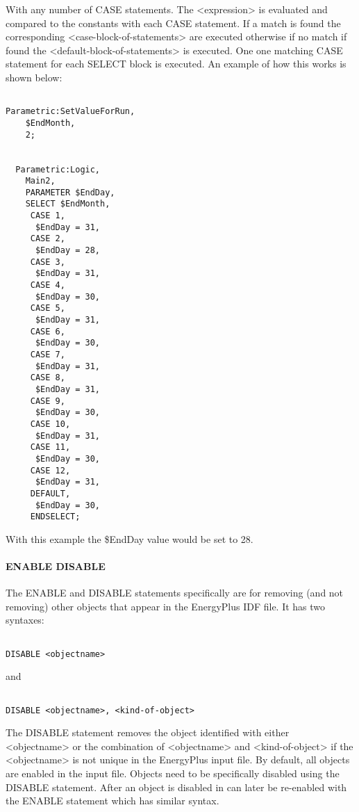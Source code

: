 With any number of CASE statements. The \textless{}expression\textgreater{} is evaluated and compared to the constants with each CASE statement. If a match is found the corresponding \textless{}case-block-of-statements\textgreater{} are executed otherwise if no match if found the \textless{}default-block-of-statements\textgreater{} is executed. One one matching CASE statement for each SELECT block is executed. An example of how this works is shown below:

\begin{lstlisting}

Parametric:SetValueForRun,
    $EndMonth,
    2;


  Parametric:Logic,
    Main2,
    PARAMETER $EndDay,
    SELECT $EndMonth,
     CASE 1,
      $EndDay = 31,
     CASE 2,
      $EndDay = 28,
     CASE 3,
      $EndDay = 31,
     CASE 4,
      $EndDay = 30,
     CASE 5,
      $EndDay = 31,
     CASE 6,
      $EndDay = 30,
     CASE 7,
      $EndDay = 31,
     CASE 8,
      $EndDay = 31,
     CASE 9,
      $EndDay = 30,
     CASE 10,
      $EndDay = 31,
     CASE 11,
      $EndDay = 30,
     CASE 12,
      $EndDay = 31,
     DEFAULT,
      $EndDay = 30,
     ENDSELECT;
\end{lstlisting}

With this example the \$EndDay value would be set to 28.

\paragraph{ENABLE DISABLE}\label{enable-disable}

The ENABLE and DISABLE statements specifically are for removing (and not removing) other objects that appear in the EnergyPlus IDF file. It has two syntaxes:

\begin{lstlisting}

DISABLE <objectname>
\end{lstlisting}

and

\begin{lstlisting}

DISABLE <objectname>, <kind-of-object>
\end{lstlisting}

The DISABLE statement removes the object identified with either \textless{}objectname\textgreater{} or the combination of \textless{}objectname\textgreater{} and \textless{}kind-of-object\textgreater{} if the \textless{}objectname\textgreater{} is not unique in the EnergyPlus input file. By default, all objects are enabled in the input file. Objects need to be specifically disabled using the DISABLE statement. After an object is disabled in can later be re-enabled with the ENABLE statement which has similar syntax.

